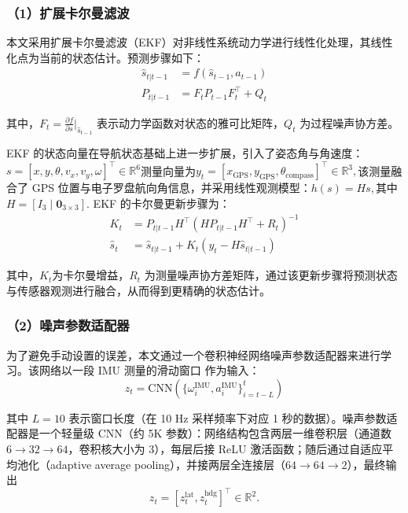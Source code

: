 \subsubsection{（1）扩展卡尔曼滤波}
本文采用扩展卡尔曼滤波（EKF）对非线性系统动力学进行线性化处理，其线性化点为当前的状态估计。预测步骤如下：
\begin{align}
    \hat{s}_{t|t-1} &= f(\hat{s}_{t-1}, a_{t-1}) \\
    P_{t|t-1} &= F_t P_{t-1} F_t^\top + Q_t
\end{align}

其中，$F_t = \frac{\partial f}{\partial s}\big|_{\hat{s}_{t-1}}$ 表示动力学函数对状态的雅可比矩阵，$Q_t$ 为过程噪声协方差。

EKF 的状态向量在导航状态基础上进一步扩展，引入了姿态角与角速度：$s = [x, y, \theta, v_x, v_y, \omega]^\top \in \mathbb{R}^6$测量向量为$y_t = [x_{\text{GPS}}, y_{\text{GPS}}, \theta_{\text{compass}}]^\top \in \mathbb{R}^3,$该测量融合了 GPS 位置与电子罗盘航向角信息，并采用线性观测模型：$h(s) = H s,$其中$H = [I_3 \mid \mathbf{0}_{3\times3}]$.
EKF 的卡尔曼更新步骤为：
\begin{align}
    K_t &= P_{t|t-1} H^\top (H P_{t|t-1} H^\top + R_t)^{-1} \\
    \hat{s}_t &= \hat{s}_{t|t-1} + K_t(y_t - H\hat{s}_{t|t-1})
\end{align}

其中，$K_t$为卡尔曼增益，$R_t$ 为测量噪声协方差矩阵，通过该更新步骤将预测状态与传感器观测进行融合，从而得到更精确的状态估计。

 \subsubsection{（2）噪声参数适配器}
为了避免手动设置的误差，本文通过一个卷积神经网络噪声参数适配器来进行学习。该网络以一段 IMU 测量的滑动窗口 作为输入：
\begin{equation}
    z_t = \text{CNN}\left(\{\omega^{\text{IMU}}_i, a^{\text{IMU}}_i\}_{i=t-L}^{t}\right)
\label{eq:noise_cnn}
\end{equation}

其中 $L=10$ 表示窗口长度（在 10 Hz 采样频率下对应 1 秒的数据）。噪声参数适配器是一个轻量级 CNN（约 5K 参数）：网络结构包含两层一维卷积层（通道数 $6 \rightarrow 32 \rightarrow 64$，卷积核大小为 3），每层后接 ReLU 激活函数；随后通过自适应平均池化（adaptive average pooling），并接两层全连接层（$64 \rightarrow 64 \rightarrow 2$），最终输出
\begin{equation}
    z_t = [z^{\text{lat}}_t, z^{\text{hdg}}_t]^\top \in \mathbb{R}^2.
\end{equation}

